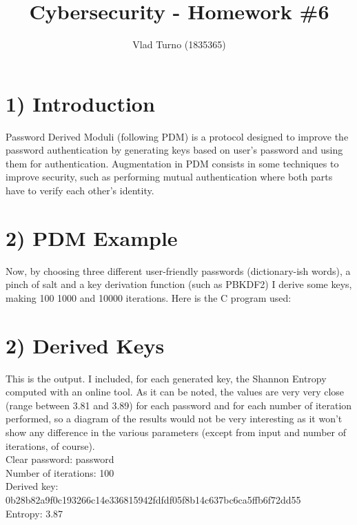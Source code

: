 \documentclass{article}
\title{Cybersecurity - Homework \#6}
\author{Vlad Turno (1835365)}
\begin{document}
\maketitle

\section*{1) Introduction}
Password Derived Moduli (following PDM) is a protocol designed to improve the password authentication by generating keys based on user's password and using them for authentication. Augmentation in PDM consists in some techniques to improve security, such as performing mutual authentication where both parts have to verify each other's identity.\\

\section*{2) PDM Example}
Now, by choosing three different user-friendly passwords (dictionary-ish words), a pinch of salt and a key derivation function (such as PBKDF2) I derive some keys, making 100 1000 and 10000 iterations. Here is the C program used:\\ 



\section*{2) Derived Keys}
This is the output. I included, for each generated key, the Shannon Entropy computed with an online tool. As it can be noted, the values are very very close (range between 3.81 and 3.89) for each password and for each number of iteration performed, so a diagram of the results would not be very interesting as it won't show any difference in the various parameters (except from input and number of iterations, of course).\\

Clear password: password\\
Number of iterations: 100\\
Derived key: 0b28b82a9f0c193266c14e336815942fdfdf05f8b14c637bc6ca5ffb6f72dd55\\
Entropy: 3.87\\
\end{document}
